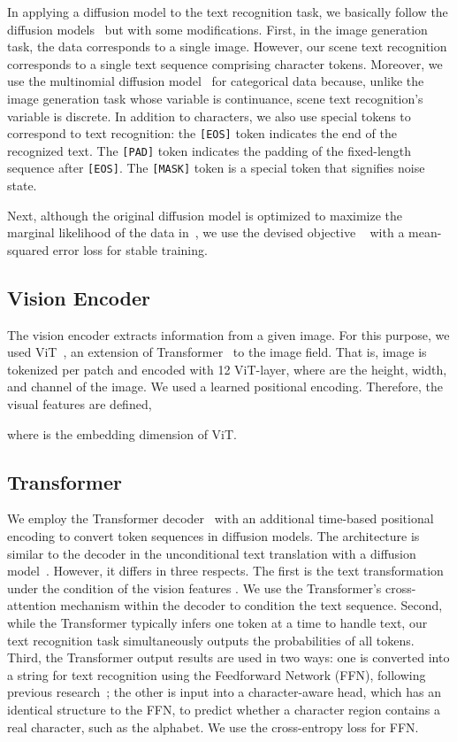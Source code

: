 \documentclass{article}
\begin{document}
In applying a diffusion model to the text recognition task, we basically follow the diffusion models~\cite{sohl2015diffusionmodel, Hoogeboom2021argmax} but with some modifications.
First, in the image generation task, the data  corresponds to a single image. 
However, our scene text recognition corresponds to a single text sequence comprising character tokens.
Moreover, we use the multinomial diffusion model~\cite{Hoogeboom2021argmax} for categorical data because, unlike the image generation task whose variable is continuance, scene text recognition's variable is discrete.
In addition to characters, we also use special tokens to correspond to text recognition: the \texttt{[EOS]} token indicates the end of the recognized text. 
The \texttt{[PAD]} token indicates the padding of the fixed-length sequence after \texttt{[EOS]}.
The \texttt{[MASK]} token is a special token that signifies noise state.

Next, although the original diffusion model is optimized to maximize the marginal likelihood of the data in~\cite{sohl2015diffusionmodel}, we use the devised objective ~\cite{ho2020ddpm} with a mean-squared error loss for stable training.


\subsection{Vision Encoder}
The vision encoder  extracts information from a given image.
For this purpose, we used ViT~\cite{dosovitskiy2020vit}, an extension of Transformer~\cite{vaswani2017transformer} to the image field.
That is, image  is tokenized per  patch and encoded with 12 ViT-layer, where  are the height, width, and channel of the image.
We used a learned positional encoding.
Therefore, the visual features  are defined, 


where  is the embedding dimension of ViT.


\subsection{Transformer}
We employ the Transformer decoder~\cite{vaswani2017transformer}  with an additional time-based positional encoding  to convert token sequences in diffusion models.
The architecture is similar to the decoder in the unconditional text translation with a diffusion model~\cite{Hoogeboom2021argmax}.
However, it differs in three respects.
The first is the text transformation under the condition of the vision features .
We use the Transformer's cross-attention mechanism within the decoder to condition the text sequence.
Second, while the Transformer typically infers one token at a time to handle text, our text recognition task simultaneously outputs the probabilities of all tokens.
Third, the Transformer output results are used in two ways: one is converted into a string for text recognition using the Feedforward Network (FFN), following previous research~\cite{bautista2022parseq}; the other is input into a character-aware head, which has an identical structure to the FFN, to predict whether a character region contains a real character, such as the alphabet.
We use the cross-entropy loss for FFN.
\end{document}
